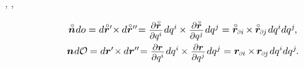 ,  , 

\nopagebreak\vspace{-0.1em}\en{\vspace{-0.32em}}
\begin{equation}\label{areavectorascrossproduct}
\begin{array}{c}
\initialunitnormal \hspace{.1ex} do = d \initiallocationvector{'} \hspace{-0.5ex} \times \hspace{-0.1ex} d \initiallocationvector{''} \hspace{-0.5ex}
= \scalebox{0.9}{$ \displaystyle\frac{\raisemath{-0.2em}{\partial \initiallocationvector}}{\partial q^i} $} \hspace{.2ex} d q^i \hspace{-0.1ex} \times \scalebox{0.9}{$ \displaystyle\frac{\raisemath{-0.2em}{\partial \initiallocationvector}}{\partial q^{j}} $} \hspace{.2ex} d q^{j}
= \initiallocationvector_\differentialindex{i} \hspace{-0.16ex} \times \hspace{-0.1ex} \initiallocationvector_\differentialindex{\hspace{-0.1ex}j} \hspace{.2ex} dq^{i} dq^{j}
\hspace{-0.2ex} ,
\\[.8em]
%
\currentunitnormal \hspace{.1ex} d\mathcal{O} \hspace{-0.1ex} = d \currentlocationvector{'} \hspace{-0.4ex} \times \hspace{-0.1ex} d \currentlocationvector{''} \hspace{-0.5ex}
= \scalebox{0.9}{$ \displaystyle\frac{\raisemath{-0.23em}{\partial \currentlocationvector}}{\partial q^i} $} \hspace{.2ex} d q^i \hspace{-0.12ex} \times \scalebox{0.9}{$ \displaystyle\frac{\raisemath{-0.23em}{\partial \currentlocationvector}}{\partial q^{j}} $} \hspace{.2ex} d q^{j}
= \currentlocationvector_\differentialindex{i} \hspace{-0.1ex} \times \hspace{-0.2ex} \currentlocationvector_\differentialindex{\hspace{-0.1ex}j} \hspace{.2ex} dq^{i} dq^{j}
\hspace{-0.2ex} .
\end{array}
\end{equation}

